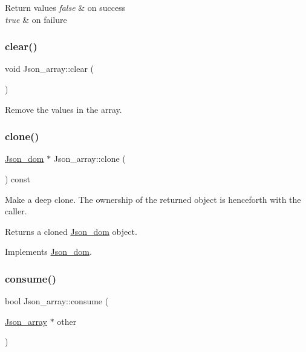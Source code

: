 \begin{DoxyRetVals}{Return values}
{\em false} & on success \\
\hline
{\em true} & on failure \\
\hline
\end{DoxyRetVals}
\mbox{\label{classJson__array_a870a69226047a6d65e114b3d32efc454}} 
\subsubsection{\texorpdfstring{clear()}{clear()}}
{\footnotesize\ttfamily void Json\+\_\+array\+::clear (\begin{DoxyParamCaption}{ }\end{DoxyParamCaption})}

Remove the values in the array. \mbox{\label{classJson__array_a936f17ef11712af8bfd2d6d1aa5c9ba1}} 
\subsubsection{\texorpdfstring{clone()}{clone()}}
{\footnotesize\ttfamily \mbox{\hyperlink{classJson__dom}{Json\+\_\+dom}} $\ast$ Json\+\_\+array\+::clone (\begin{DoxyParamCaption}{ }\end{DoxyParamCaption}) const\hspace{0.3cm}{\ttfamily [virtual]}}

Make a deep clone. The ownership of the returned object is henceforth with the caller.

\begin{DoxyReturn}{Returns}
a cloned \mbox{\hyperlink{classJson__dom}{Json\+\_\+dom}} object. 
\end{DoxyReturn}


Implements \mbox{\hyperlink{classJson__dom_a03c529d590cc4cdb747ccb82f4b70fb5}{Json\+\_\+dom}}.

\mbox{\label{classJson__array_a49c8a014041739ebb69367a5710ff802}} 
\subsubsection{\texorpdfstring{consume()}{consume()}}
{\footnotesize\ttfamily bool Json\+\_\+array\+::consume (\begin{DoxyParamCaption}\item[{\mbox{\hyperlink{classJson__array}{Json\+\_\+array}} $\ast$}]{other }\end{DoxyParamCaption})}

